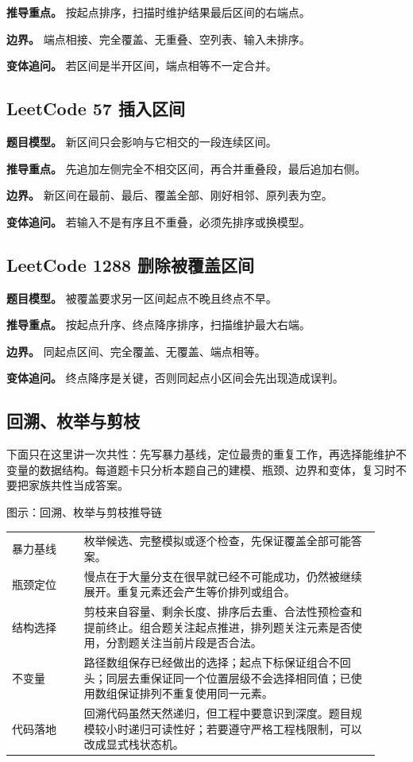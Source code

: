 \textbf{推导重点。} 按起点排序，扫描时维护结果最后区间的右端点。

\textbf{边界。} 端点相接、完全覆盖、无重叠、空列表、输入未排序。

\textbf{变体追问。} 若区间是半开区间，端点相等不一定合并。

\subsection{LeetCode 57 插入区间}

\textbf{题目模型。} 新区间只会影响与它相交的一段连续区间。

\textbf{推导重点。} 先追加左侧完全不相交区间，再合并重叠段，最后追加右侧。

\textbf{边界。} 新区间在最前、最后、覆盖全部、刚好相邻、原列表为空。

\textbf{变体追问。} 若输入不是有序且不重叠，必须先排序或换模型。

\subsection{LeetCode 1288 删除被覆盖区间}

\textbf{题目模型。} 被覆盖要求另一区间起点不晚且终点不早。

\textbf{推导重点。} 按起点升序、终点降序排序，扫描维护最大右端。

\textbf{边界。} 同起点区间、完全覆盖、无覆盖、端点相等。

\textbf{变体追问。} 终点降序是关键，否则同起点小区间会先出现造成误判。

\subsection{回溯、枚举与剪枝}
下面只在这里讲一次共性：先写暴力基线，定位最贵的重复工作，再选择能维护不变量的数据结构。每道题卡只分析本题自己的建模、瓶颈、边界和变体，复习时不要把家族共性当成答案。

\begin{principlebox}{图示：回溯、枚举与剪枝推导链}
\begin{tabular}{@{}p{0.18\linewidth}p{0.74\linewidth}@{}}
暴力基线 & 枚举候选、完整模拟或逐个检查，先保证覆盖全部可能答案。\\
瓶颈定位 & 慢点在于大量分支在很早就已经不可能成功，仍然被继续展开。重复元素还会产生等价排列或组合。\\
结构选择 & 剪枝来自容量、剩余长度、排序后去重、合法性预检查和提前终止。组合题关注起点推进，排列题关注元素是否使用，分割题关注当前片段是否合法。\\
不变量 & 路径数组保存已经做出的选择；起点下标保证组合不回头；同层去重保证同一个位置层级不会选择相同值；已使用数组保证排列不重复使用同一元素。\\
代码落地 & 回溯代码虽然天然递归，但工程中要意识到深度。题目规模较小时递归可读性好；若要遵守严格工程栈限制，可以改成显式栈状态机。\\
\end{tabular}
\end{principlebox}

